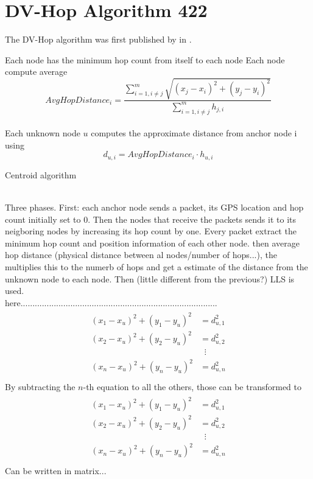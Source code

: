 \documentclass[12pt,twoside]{report}
\begin{document}
\section{DV-Hop Algorithm 422}
The DV-Hop algorithm was first published by in \cite{965964}.\\
\begin{algorithm}[H]
\SetAlgoLined
{}
 Each node has the minimum hop count from itself to each node\;
Each node compute average 
\begin{equation}
    AvgHopDistance_i=\frac{\sum_{i=1,i\neq j}^m\sqrt{(x_j-x_i)^2+(y_j-y_i)^2}}{\sum_{i=1,i\neq j}^mh_{j,i}}
\end{equation}\\
Each unknown node $u$ computes the approximate distance from anchor node i using 
\begin{equation}
    d_{u,i}=AvgHopDistance_i \cdot h_{u,i}
\end{equation}
 \caption{Centroid algorithm}
\end{algorithm}
\noindent\\ Three phases. First: each anchor node sends a packet, its GPS location and hop count initially set to 0. Then the nodes that receive the packets sends it to its neigboring nodes by increasing its hop count by one. Every packet extract the minimum hop count and position information of each other node. then average hop distance (physical distance between al nodes/number of hops...), the multiplies this to the numerb of hops and get a estimate of the distance from the unknown node to each node. Then (little different from the previous?) LLS is used.
\\here...................................................................................\\
\begin{align}
\begin{split} 
(x_1-x_u)^2+(y_1-y_u)^2&=d_{u,1}^2 \\ 
(x_2-x_u)^2+(y_2-y_u)^2&=d_{u,2}^2 \\ 
&\;\;\vdots\\
(x_n-x_u)^2+(y_n-y_u)^2&=d_{u,n}^2 \\
\end{split}
\end{align}
By subtracting the $n$-th equation to all the others, those can be transformed to
\begin{align}
\begin{split} 
(x_1-x_u)^2+(y_1-y_u)^2&=d_{u,1}^2 \\ 
(x_2-x_u)^2+(y_2-y_u)^2&=d_{u,2}^2 \\ 
&\;\;\vdots\\
(x_n-x_u)^2+(y_n-y_u)^2&=d_{u,n}^2 \\
\end{split}
\end{align}
Can be written in matrix...
\clearpage
\end{document}
